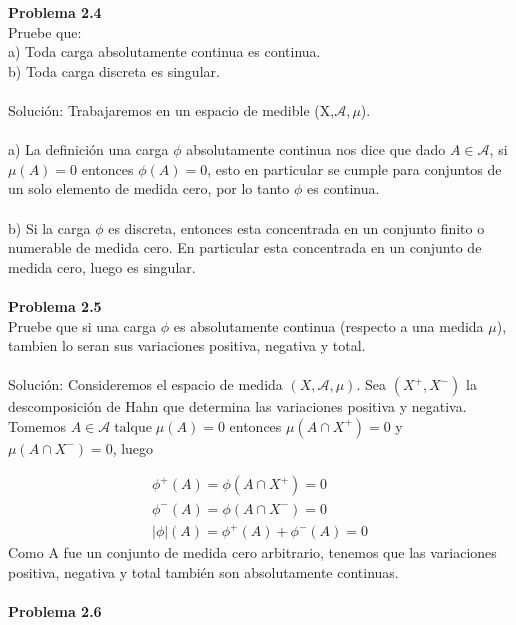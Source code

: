 \documentclass[12pt]{article}
\begin{document}
    \textbf{Problema 2.4} \\

    Pruebe que: \\
    a) Toda carga absolutamente continua es continua. \\
    b) Toda carga discreta es singular. 
    \\ \\
    Soluci\'on: Trabajaremos en un espacio de medible (X,$\mathscr{A},\mu$). 
    \\ \\
    a) La definici\'on una carga $\phi$ absolutamente continua nos dice que dado 
    $A\in \mathscr{A}$, si $\mu (A)=0$ entonces $\phi (A)=0$, esto en particular se cumple para 
    conjuntos de un solo elemento de medida cero, por lo tanto $\phi$ es continua. \\ \\
    b) Si la carga $\phi$ es discreta, entonces esta concentrada en un conjunto finito o numerable de medida cero. 
    En particular esta concentrada en un conjunto de medida cero, luego es singular.\\ \\ 

    \textbf{Problema 2.5} \\

    Pruebe que si una carga $\phi$ es absolutamente continua (respecto a una medida $\mu$),
    tambien lo seran sus variaciones positiva, negativa y total.
    \\ \\
    Soluci\'on: Consideremos el espacio de medida $(X,\mathscr{A},\mu)$. Sea $(X^+,X^-)$ la 
    descomposici\'on de Hahn que determina las variaciones positiva y negativa. Tomemos 
    $A\in \mathscr{A} \; \mathrm{tal que} \; \mu (A)=0$ entonces $\mu (A\cap X^+)=0$ y 
    $\mu (A\cap X^-)=0$, luego

    \begin{gather*}
        \phi^+(A)=\phi (A\cap X^+)=0 \\
        \phi^-(A)=\phi (A\cap X^-)=0 \\
        |\phi|(A)=\phi^+(A)+\phi^-(A)=0
    \end{gather*}
    Como A fue un conjunto de medida cero arbitrario, tenemos que las variaciones positiva,
    negativa y total tambi\'en son absolutamente continuas.    
    \\ \\

    \textbf{Problema 2.6}
\end{document}
